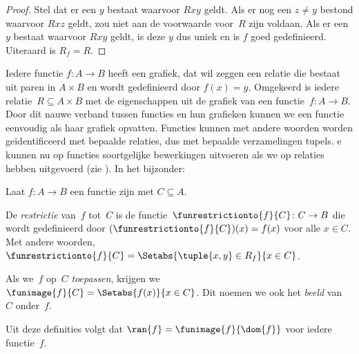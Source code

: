 \documentclass[openany]{memoir}
\begin{document}
\begin{proof}
Stel dat er een $y$ bestaat waarvoor $Rxy$ geldt. Als er nog een $z
\neq y$ bestond waarvoor $Rxz$ geldt, zou niet aan de voorwaarde
voor~$R$ zijn voldaan. Als er een $y$ bestaat waarvoor $Rxy$ geldt, is
deze $y$ dus uniek en is $f$ goed gedefinieerd. Uiteraard is $R_f =
R$.
\end{proof}

\begin{explain}
Iedere functie $f\colon A \to B$ heeft een grafiek, dat wil zeggen een
relatie die bestaat uit paren in $A \times B$ en wordt gedefinieerd
door $f(x) = y$.
Omgekeerd is iedere relatie~$R \subseteq A \times B$ met de
eigenschappen uit  de grafiek van een
functie~$f \colon A \to B$. Door dit nauwe verband tussen functies en
hun grafieken kunnen we een functie eenvoudig als haar grafiek
opvatten. Functies kunnen met andere woorden worden geïdentificeerd
met bepaalde relaties, dus met bepaalde verzamelingen tupels.
e
kunnen nu op functies soortgelijke bewerkingen uitvoeren als we op
relaties hebben uitgevoerd (zie ). In het
bijzonder:
\end{explain}

\begin{defn}
Laat $f \colon A \to B$ een functie zijn met $C\subseteq A$.

De \emph{restrictie} van~$f$ tot~$C$ is de
functie~$\funrestrictionto{f}{C}\colon C \to B$ die wordt gedefinieerd
door $(\funrestrictionto{f}{C})(x) = f(x)$ voor alle $x \in C$. Met
andere woorden, $\funrestrictionto{f}{C} = \Setabs{\tuple{x, y} \in
R_f}{x \in C}$.

Als we~$f$ op~$C$ \emph{toepassen}, krijgen we $\funimage{f}{C} =
\Setabs{f(x)}{x \in C}$. Dit noemen we ook het \emph{beeld} van~$C$
onder~$f$.
\end{defn}

\begin{explain}
Uit deze definities volgt dat $\ran{f} =
\funimage{f}{\dom{f}}$ voor iedere functie~$f$.
\end{explain}
\endgroup
\end{document}
